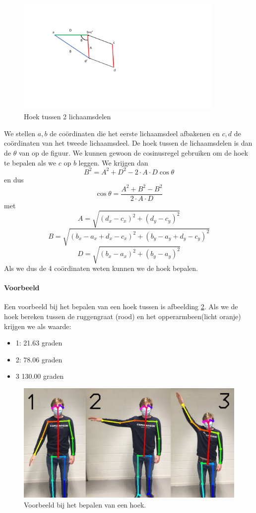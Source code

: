 \documentclass[a4paper,twoside,kulak]{kulakreport}
\begin{document}
\begin{figure}[H]
	\begin{center}
		\includegraphics[width=10cm]{cos.pdf}
	\end{center}
	\caption{Hoek tussen 2 lichaamsdelen}
	\label{cos}
\end{figure}

We stellen \(a, b\) de coördinaten die het eerste lichaamsdeel afbakenen en \(c, d\) de coördinaten van het tweede lichaamsdeel. De hoek tussen de lichaamsdelen is dan de \(\theta\) van op de figuur. We kunnen gewoon de cosinusregel gebruiken om de hoek te bepalen als we \(c\) op \(b\) leggen. We krijgen dan
\[B^2 = A^2 + D^2 -2\cdot A\cdot D\cos\theta\]
en dus
\[\cos\theta = \frac{A^2 + B^2 - B^2}{2\cdot A\cdot D}\]
met
\[A = \sqrt{(d_x - c_x)^2 + (d_y - c_y)^2}\]
\[B = \sqrt{(b_x - a_x + d_x - c_x)^2 + (b_y - a_y + d_y - c_y)^2}\]
\[D = \sqrt{(b_x - a_x)^2 + (b_y - a_y)^2}\]
Als we dus de 4 coördinaten weten kunnen we de hoek bepalen.
\paragraph{Voorbeeld}
Een voorbeeld bij het bepalen van een hoek tussen is afbeelding \ref{samen}. Als we de hoek bereken tussen de ruggengraat (rood) en het opperarmbeen(licht oranje) krijgen we als waarde:
\begin{itemize}
	\item 1: 21.63 graden
	\item 2: 78.06 graden
	\item 3 130.00 graden
\end{itemize}
\begin{figure}
	\begin{center}
		\includegraphics[width=12cm]{samen.jpg}
	\end{center}
	\caption{Voorbeeld bij het bepalen van een hoek.}
	\label{samen}
\end{figure}
\end{document}
